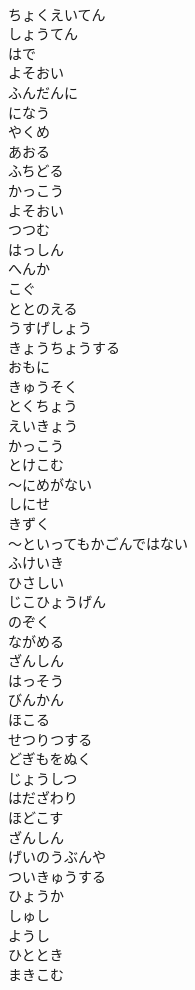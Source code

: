 \documentclass[8pt]{extreport}
\begin{document}
\begin{CJK}{UTF8}{min}
\\	ちょくえいてん
\\	しょうてん
\\	はで
\\	よそおい
\\	ふんだんに
\\	になう
\\	やくめ
\\	あおる
\\	ふちどる
\\	かっこう
\\	よそおい
\\	つつむ
\\	はっしん
\\	へんか
\\	こぐ
\\	ととのえる
\\	うすげしょう
\\	きょうちょうする
\\	おもに
\\	きゅうそく
\\	とくちょう
\\	えいきょう
\\	かっこう
\\	とけこむ
\\	～にめがない
\\	しにせ
\\	きずく
\\	～といってもかごんではない
\\	ふけいき
\\	ひさしい
\\	じこひょうげん
\\	のぞく
\\	ながめる
\\	ざんしん
\\	はっそう
\\	びんかん
\\	ほこる
\\	せつりつする
\\	どぎもをぬく
\\	じょうしつ
\\	はだざわり
\\	ほどこす
\\	ざんしん
\\	げいのうぶんや
\\	ついきゅうする
\\	ひょうか
\\	しゅし
\\	ようし
\\	ひととき
\\	まきこむ

\end{CJK}
\end{document}
